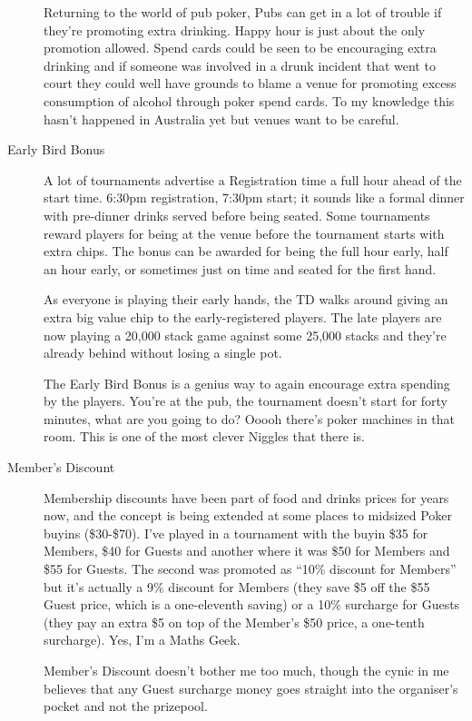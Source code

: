 \begin{description}
Returning to the world of pub poker, Pubs can get in a lot of trouble
if they're promoting extra drinking. Happy hour is just about the only
promotion allowed. Spend cards could be seen to be encouraging
extra drinking and if someone was involved in a drunk incident
that went to court they could well have grounds to blame a venue for
promoting excess consumption of alcohol through poker
spend cards. To my knowledge this hasn't happened in Australia yet
but venues want to be careful.

\item[Early Bird Bonus] A lot of tournaments advertise a Registration
time a full hour ahead of the start time. 6:30pm registration, 7:30pm
start; it sounds like a formal dinner with pre-dinner drinks served
before being seated. Some tournaments reward players for being
at the venue before the tournament starts with extra
chips. The bonus can be awarded for being the full hour early, half an
hour early, or sometimes just on time and seated for the first hand.

As everyone is playing their early hands, the TD walks around
giving an extra big value chip to the early-registered players. The
late players are now playing a 20,000 stack game against some
25,000 stacks and they're already behind without losing a single pot.

The Early Bird Bonus is a genius way to again encourage extra
spending by the players. You're at the pub, the tournament doesn't
start for forty minutes, what are you going to do? Ooooh there's poker
machines in that room. This is one of the most clever Niggles that
there is.

\item[Member's Discount] Membership discounts have been part
of food and drinks prices for years now, and the concept
is being extended at some places to midsized Poker buyins
(\$30-\$70). I've played in a tournament with the buyin
\$35 for Members, \$40 for Guests and another where it was \$50
for Members and \$55 for Guests. The second was promoted as ``10\%
discount for Members'' but it's actually a 9\% discount for Members
(they save \$5 off the \$55 Guest price, which is a one-eleventh saving)
or a 10\% surcharge for Guests (they pay an extra \$5 on top of the
Member's \$50 price, a one-tenth surcharge). Yes, I'm a Maths Geek.

Member's Discount doesn't bother me too much, though the
cynic in me believes that any Guest surcharge money
goes straight into the organiser's pocket and not the prizepool.


\end{description}
